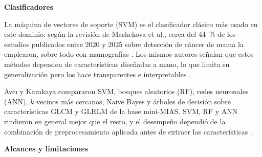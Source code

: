 \textbf{Clasificadores}

La máquina de vectores de soporte (SVM) es el clasificador clásico más usado en este dominio: según la revisión de Mashekova et al., cerca del 44~\% de los estudios publicados entre 2020 y 2025 sobre detección de cáncer de mama la emplearon, sobre todo con mamografías \cite{Mashekova2025AIBreastCancer}.
Los mismos autores señalan que estos métodos dependen de características diseñadas a mano, lo que limita su generalización pero los hace transparentes e interpretables \cite{Mashekova2025AIBreastCancer}.

Avcı y Karakaya compararon SVM, bosques aleatorios (RF), redes neuronales (ANN), $k$ vecinos más cercanos, Naive Bayes y árboles de decisión sobre características GLCM y GLRLM de la base mini-MIAS. SVM, RF y ANN rindieron en general mejor que el resto, y el desempeño dependió de la combinación de preprocesamiento aplicada antes de extraer las características \cite{Avci2023MammographyEnhancement}.

\textbf{Alcances y limitaciones}

